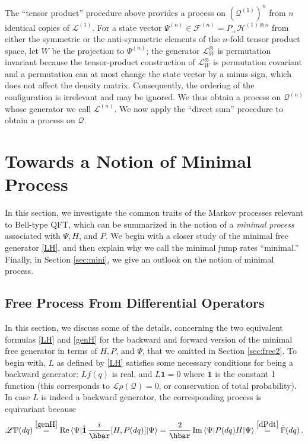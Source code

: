 \documentclass[12pt]{article}
\newcommand{\I}{i} %
\newcommand{\1}{\mathbf{1}} %
\renewcommand{\Re}{\mathrm{Re}} %
\renewcommand{\Im}{\mathrm{Im}} %
\newcommand{\Hilbert}{\mathscr{H}}
\renewcommand{\sp}[2]{\langle #1 | #2 \rangle} %
\newcommand{\Fock}{\mathscr{F}} %
\newcommand{\conf}{\mathcal{Q}} %
\newcommand{\measure}{\mathbb{P}} %
\newcommand{\generator}{\mathscr{L}} %
\newcommand{\pov}{{P}}%
\begin{document}
The ``tensor product'' procedure above provides a process on
$(\conf^{(1)})^n$ from $n$ identical copies of $\generator^{(1)}$.
For a state vector $\Psi^{(n)} \in \Fock^{(n)} = P_\pm
\Hilbert^{(1)\otimes n}$ from either the symmetric or the
anti-symmetric elements of the $n$-fold tensor product space, let $W$
be the projection to $\Psi^{(n)}$; the generator
$\generator^\otimes_W$ is permutation invariant because the
tensor-product construction of $\generator^\otimes _W$ is permutation
covariant and a permutation can at most change the state vector by a
minus sign, which does not affect the density matrix. Consequently,
the ordering of the configuration is irrelevant and may be ignored. We
thus obtain a process on $\conf^{(n)}$ whose generator we call
$\generator^{(n)}$. We now apply the ``direct sum'' procedure to
obtain a process on $\conf$.




\section{Towards a Notion of Minimal Process}

In this section, we investigate the common traits of the Markov
processes relevant to Bell-type QFT, which can be summarized in the
notion of a \emph{minimal process} associated with $\Psi,H$, and
$\pov$. We begin with a closer study of the minimal free generator
\eqref{LH}, and then explain  why we call the minimal jump rates
``minimal.'' Finally, in Section \ref{sec:mini}, we give an outlook on
the notion of minimal process.

\subsection{Free Process From Differential Operators}
\label{sec:freeflow}

In this section, we discuss some of the details, concerning the two
equivalent formulas \eqref{LH} and \eqref{genH} for the backward and
forward version of the minimal free generator in terms of $H, \pov$,
and $\Psi$, that we omitted in Section \ref{sec:free2}.  To begin
with, $L$ as defined by \eqref{LH} satisfies some necessary conditions
for being a backward generator: $Lf(q)$ is real, and $L\1 =0$ where
$\1$ is the constant 1 function (this corresponds to $\generator \rho
(\conf) =0$, or conservation of total probability). In case $L$ is
indeed a backward generator, the corresponding process is equivariant
because
\[
   \generator \measure (dq) \stackrel{\eqref{genH}}{=} \Re \, \sp{\Psi}
   {\hat{\1}\,\frac{\I}{\hbar} [H,\pov(dq)] |\Psi} = \frac{2}{\hbar} \,
   \Im \, \sp{\Psi} {\pov(dq) H|\Psi} \stackrel{\eqref{dPdt}}{=}
   \dot{\measure}(dq)\,.
\]
\end{document}

